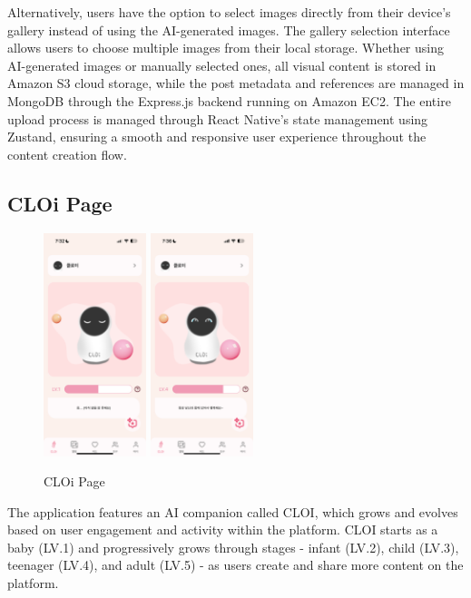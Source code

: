         Alternatively, users have the option to select images directly from their device's gallery instead of using the AI-generated images. The gallery selection interface allows users to choose multiple images from their local storage. Whether using AI-generated images or manually selected ones, all visual content is stored in Amazon S3 cloud storage, while the post metadata and references are managed in MongoDB through the Express.js backend running on Amazon EC2. The entire upload process is managed through React Native's state management using Zustand, ensuring a smooth and responsive user experience throughout the content creation flow.

  \subsection{CLOi Page}
        \begin{figure}[htbp]
            \centerline{\includegraphics[width=3cm]{Images/page/cloi1.png}
            \includegraphics[width=3cm]{Images/page/cloi4.png}
            }
            \caption{CLOi Page}
            \label{fig}
        \end{figure}
        The application features an AI companion called CLOI, which grows and evolves based on user engagement and activity within the platform. CLOI starts as a baby (LV.1) and progressively grows through stages - infant (LV.2), child (LV.3), teenager (LV.4), and adult (LV.5) - as users create and share more content on the platform.

